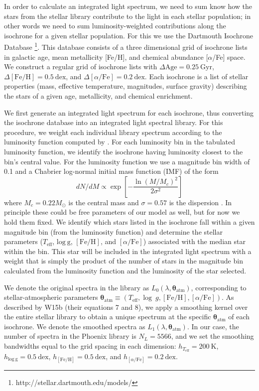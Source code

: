\documentclass[twocolumn]{aastex6}
\def\feh{\mathrm{[Fe/H]}}
\def\afe{[\alpha/\mathrm{Fe}]}
\def\age{\mathrm{Age}}
\begin{document}
In order to calculate an integrated light spectrum, we need to sum know how the stars from the stellar library contribute to the light in each stellar population; in other words we need to sum luminosity-weighted contributions along the isochrone for a given stellar population.
For this we use the Dartmouth Isochrone Database \citep{Dotter2008}\footnote{http://stellar.dartmouth.edu/models/}.
This database consists of a three dimensional grid of isochrone lists in galactic age, mean metallicity [Fe/H], and chemical abundance [$\alpha$/Fe] space.
We construct a regular grid of isochrone lists with $\Delta\age=0.25\ \mathrm{Gyr}$, $\Delta\feh=0.5\ \mathrm{dex}$, and $\Delta\afe=0.2\ \mathrm{dex}$.
Each isochrone is a list of stellar properties (mass, effective temperature, magnitudes, surface gravity) describing the stars of a given age, metallicity, and chemical enrichment.

We first generate an integrated light spectrum for each isochrone, thus converting the isochrone database into an integrated light spectral library.
For this procedure, we weight each individual library spectrum according to the luminosity function computed by \citet{Dotter2008}.
For each luminosity bin in the tabulated luminosity function, we identify the isochrone having luminosity closest to the bin's central value.
For the luminosity function we use a magnitude bin width of 0.1 and a Chabrier log-normal initial mass function (IMF) of the form
\begin{equation}
\label{IMF}
dN/dM\propto \exp\left[-\frac{\ln\left(M/M_c\right)^2}{2\sigma^2}\right]
\end{equation}
where $M_c=0.22M_\odot$ is the central mass and $\sigma=0.57$ is the dispersion \citep{Chabrier2003}.
In principle these could be free parameters of our model as well, but for now we hold them fixed.
We identify which stars listed in the isochrone fall within a given magnitude bin (from the luminosity function) and determine the stellar parameters ($T_\mathrm{eff}$, $\mathrm{log\ g}$, $\feh$, and $\afe$) associated with the median star within the bin.
This star will be included in the integrated light spectrum with a weight that is simply the product of the number of stars in the magnitude bin calculated from the luminosity function and the luminosity of the star selected.

We denote the original spectra in the library as $L_0(\lambda,\bm{\theta}_\mathrm{atm})$, corresponding to stellar-atmospheric parameters $\bm{\theta}_\mathrm{atm}\equiv\left(T_\mathrm{eff},\log\ g, [\mathrm{Fe/H}], [\alpha/\mathrm{Fe}]\right)$.
As described by W15b (their equations 7 and 8), we apply a smoothing kernel over the entire stellar library to obtain a unique spectrum at the specific $\bm{\theta}_\mathrm{atm}$ of each isochrone.
We denote the smoothed spectra as $L_1(\lambda,\bm{\theta}_\mathrm{atm})$.
In our case, the number of spectra in the Phoenix library is $N_L=5566$, and we set the smoothing bandwidths equal to the grid spacing in each dimension: $h_{T_\mathrm{eff}}=200\ \mathrm{K}$, $h_\mathrm{log\ g}=0.5\ \mathrm{dex}$, $h_\mathrm{[Fe/H]}=0.5\ \mathrm{dex}$, and $h_{[\alpha/\mathrm{Fe}]}=0.2\ \mathrm{dex}$.
\end{document}
